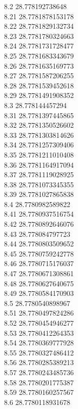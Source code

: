 {8.2	28.778192738648\\
8.21	28.7781878153178\\
8.22	28.7781829132734\\
8.23	28.7781780324663\\
8.24	28.7781731728477\\
8.25	28.7781683343679\\
8.26	28.7781635169773\\
8.27	28.7781587206255\\
8.28	28.7781539452618\\
8.29	28.7781491908352\\
8.3	28.778144457294\\
8.31	28.7781397445865\\
8.32	28.7781350526602\\
8.33	28.7781303814626\\
8.34	28.7781257309406\\
8.35	28.7781211010408\\
8.36	28.7781164917094\\
8.37	28.7781119028925\\
8.38	28.7781073345355\\
8.39	28.7781027865838\\
8.4	28.7780982589822\\
8.41	28.7780937516754\\
8.42	28.7780892646076\\
8.43	28.778084797723\\
8.44	28.7780803509652\\
8.45	28.7780759242778\\
8.46	28.7780715176037\\
8.47	28.7780671308861\\
8.48	28.7780627640675\\
8.49	28.7780584170903\\
8.5	28.7780540898967\\
8.51	28.7780497824286\\
8.52	28.7780454946277\\
8.53	28.7780412264353\\
8.54	28.7780369777928\\
8.55	28.7780327486412\\
8.56	28.7780285389213\\
8.57	28.7780243485736\\
8.58	28.7780201775387\\
8.59	28.7780160257567\\
8.6	28.7780118931678\\
}
